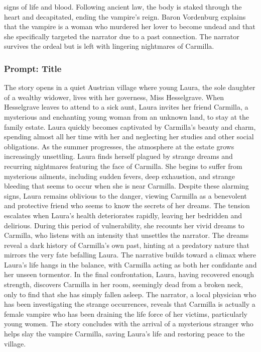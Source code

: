 \documentclass{article} %
\begin{document}
signs of life and blood. Following ancient law, the body is staked through the heart and decapitated, ending the vampire's reign. \textcolor{skipred}{Baron Vordenburg explains that the vampire is a woman who murdered her lover to become undead and that she specifically targeted the narrator due to a past connection.} The narrator survives the ordeal but is left with lingering nightmares of Carmilla.

\subsubsection{Prompt: Title}

\textcolor{skipred}{The story opens in a quiet Austrian village where young Laura, the sole daughter of a wealthy widower, lives with her governess, Miss Hesselgrave.} When Hesselgrave leaves to attend to a sick aunt, Laura invites her friend Carmilla, a mysterious and enchanting young woman from an unknown land, to stay at the family estate. Laura quickly becomes captivated by Carmilla's beauty and charm, spending almost all her time with her and neglecting her studies and other social obligations. As the summer progresses, the atmosphere at the estate grows increasingly unsettling. Laura finds herself plagued by strange dreams and recurring nightmares featuring the face of Carmilla. She begins to suffer from mysterious ailments, including sudden fevers, deep exhaustion, and strange bleeding that seems to occur when she is near Carmilla. Despite these alarming signs, Laura remains oblivious to the danger, viewing Carmilla as a benevolent and protective friend who seems to know the secrets of her dreams. The tension escalates when Laura's health deteriorates rapidly, leaving her bedridden and delirious. During this period of vulnerability, she recounts her vivid dreams to Carmilla, who listens with an intensity that unsettles the narrator. The dreams reveal a dark history of Carmilla's own past, hinting at a predatory nature that mirrors the very fate befalling Laura. The narrative builds toward a climax where Laura's life hangs in the balance, with Carmilla acting as both her confidante and her unseen tormentor. In the final confrontation, Laura, having recovered enough strength, discovers Carmilla in her room, seemingly dead from a broken neck, only to find that she has simply fallen asleep. The narrator, a local physician who has been investigating the strange occurrences, reveals that Carmilla is actually a female vampire who has been draining the life force of her victims, particularly young women. The story concludes with the arrival of a mysterious stranger who helps slay the vampire Carmilla, saving Laura's life and restoring peace to the village.
\end{document}
